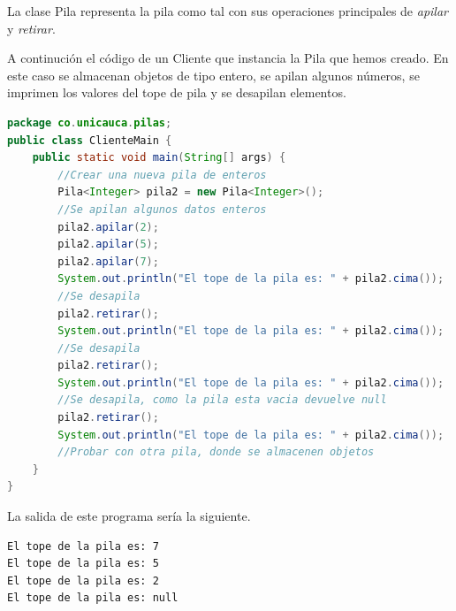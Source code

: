 La clase Pila representa la pila como tal con sus operaciones principales de \textsl{apilar} y \textsl{retirar}. 

A continución el código de un Cliente que instancia la Pila que hemos creado. En este caso se almacenan objetos de tipo entero, se apilan algunos números, se imprimen los valores del tope de pila y se desapilan elementos.

\begin{lstlisting}[language=Java]
package co.unicauca.pilas;
public class ClienteMain {
	public static void main(String[] args) {
		//Crear una nueva pila de enteros
		Pila<Integer> pila2 = new Pila<Integer>();
		//Se apilan algunos datos enteros
		pila2.apilar(2);
		pila2.apilar(5);
		pila2.apilar(7);
		System.out.println("El tope de la pila es: " + pila2.cima());
		//Se desapila
		pila2.retirar();
		System.out.println("El tope de la pila es: " + pila2.cima());
		//Se desapila
		pila2.retirar();
		System.out.println("El tope de la pila es: " + pila2.cima());
		//Se desapila, como la pila esta vacia devuelve null
		pila2.retirar();
		System.out.println("El tope de la pila es: " + pila2.cima());
 		//Probar con otra pila, donde se almacenen objetos
 	}
}
\end{lstlisting}

La salida de este programa sería la siguiente.

\begin{lstlisting}[numbers=none]
El tope de la pila es: 7
El tope de la pila es: 5
El tope de la pila es: 2
El tope de la pila es: null
\end{lstlisting}

